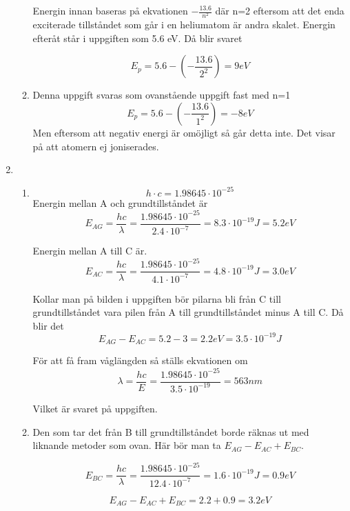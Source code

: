 \documentclass[a4paper,12pt]{article}
\begin{document}
\begin{enumerate}
\begin{enumerate}
                        Energin innan baseras på ekvationen $-\frac{13.6}{n^2}$ där
                        n=2 eftersom att det enda exciterade tillståndet som går i en
                        heliumatom är andra skalet. Energin efteråt står i uppgiften
                        som 5.6 eV. Då blir svaret

                        $$E_p=5.6-(-\frac{13.6}{2^2})=9eV$$

                  \item Denna uppgift svaras som ovanstående uppgift fast med n=1
                        $$E_p=5.6-(-\frac{13.6}{1^2})=-8eV$$
                        Men eftersom att negativ energi är omöjligt så går detta inte.
                        Det visar på att atomern ej joniserades.
            \end{enumerate}

      \item 
      \begin{enumerate}
            \item 
            $$h\cdot c=1.98645\cdot 10^{-25}$$
            Energin mellan A och grundtillståndet är
            $$E_{AG}=\frac{hc}{\lambda}=\frac{1.98645\cdot 10^{-25}}{2.4\cdot 10^{-7}}=8.3\cdot 10^{-19}J=5.2eV$$
            
            Energin mellan A till C är.
            $$E_{AC}=\frac{hc}{\lambda}=\frac{1.98645\cdot 10^{-25}}{4.1\cdot 10^{-7}}=4.8\cdot 10^{-19}J=3.0eV$$
            
            Kollar man på bilden i uppgiften bör pilarna 
            bli från C till grundtillståndet vara pilen från
            A till grundtillståndet minus A till C. 
            Då blir det 
            $$E_{AG}-E_{AC}=5.2-3=2.2eV=3.5\cdot 10^{-19}J$$
            
            För att få fram våglängden så ställs ekvationen om
            $$\lambda=\frac{hc}{E}=\frac{1.98645\cdot 10^{-25}}{3.5\cdot 10^{-19}}=563nm$$
            
            Vilket är svaret på uppgiften.

            \item 
            Den som tar det från B till grundtillståndet borde
            räknas ut med liknande metoder som ovan. Här bör man ta
            $E_{AG}-E_{AC}+E_{BC}$.
            
            $$E_{BC}=\frac{hc}{\lambda}=\frac{1.98645\cdot 10^{-25}}{12.4\cdot 10^{-7}}=1.6\cdot 10^{-19}J=0.9eV$$
      
            $$E_{AG}-E_{AC}+E_{BC}=2.2+0.9=3.2eV$$
      

\end{enumerate}
\end{enumerate}
\end{document}
